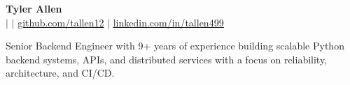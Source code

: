 \documentclass[letterpaper,11pt]{article}
\begin{document}
\begin{center}
    \textbf{\Huge Tyler Allen} \\ \vspace{1pt}
    \small {\PhoneNumber} $|$ \href{mailto:{\EmailAddress}}{\underline{\EmailAddress}} $|$ 
    \href{https://github.com/tallen12}{\underline{github.com/tallen12}} $|$ \href{https://www.linkedin.com/in/tyler-allen-08477a29}{\underline{linkedin.com/in/tallen499}}
\end{center}

{\vspace{7pt}\small 
Senior Backend Engineer with 9+ years of experience building scalable Python backend systems, APIs, and distributed services with a focus on reliability, architecture, and CI/CD.

}
\end{document}
